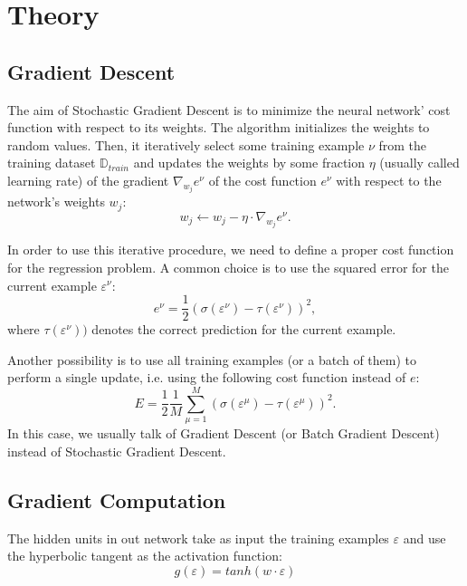 \section{Theory}
\label{sec:theory}

\subsection{Gradient Descent}
The aim of Stochastic Gradient Descent is to minimize the neural network' cost function with respect to its weights.
The algorithm initializes the weights to random values.
Then, it iteratively select some training example $\nu$ from the training dataset $\mathbb{D}_{train}$ and updates the weights by some fraction $\eta$ (usually called learning rate) of the gradient $\nabla_{w_j} e^\nu$ of the cost function $e^\nu$ with respect to the network's weights $w_j$:
\begin{equation}
    \label{eq:weights-update}
    w_j \leftarrow w_j - \eta \cdot \nabla_{w_j} e^\nu.
\end{equation}

In order to use this iterative procedure, we need to define a proper cost function for the regression problem.
A common choice is to use the squared error for the current example $\varepsilon^\nu$:
\begin{equation}
    \label{eq:cost}
    e^\nu = \frac{1}{2} (\sigma(\varepsilon^\nu) - \tau(\varepsilon^\nu))^2,
\end{equation}
where $\tau(\varepsilon^\nu))$ denotes the correct prediction for the current example.

Another possibility is to use all training examples (or a batch of them) to perform a single update, i.e. using the following cost function instead of $e$:
\begin{equation}
    \label{eq:cost-total}
    E = \frac{1}{2} \frac{1}{M} \sum_{\mu = 1}^{M} (\sigma(\varepsilon^\mu) - \tau(\varepsilon^\mu))^2.
\end{equation}
In this case, we usually talk of Gradient Descent (or Batch Gradient Descent) instead of Stochastic Gradient Descent.

\subsection{Gradient Computation}
The hidden units in out network take as input the training examples $\varepsilon$ and use the hyperbolic tangent as the activation function:
\begin{equation}
    g(\varepsilon) = tanh(w \cdot \varepsilon)
\end{equation}

